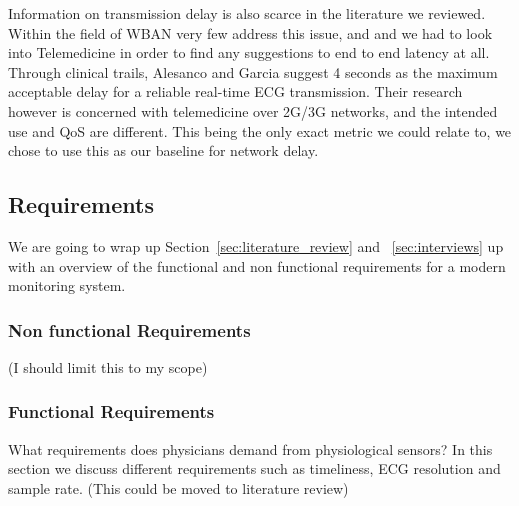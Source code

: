 Information on transmission delay is also scarce in the literature we reviewed. Within the field of WBAN very few address this issue, and and we had to look into Telemedicine in order to find any suggestions to end to end latency at all. Through clinical trails, Alesanco and Garcia suggest 4 seconds as the maximum acceptable delay for a reliable real-time ECG transmission. Their research however is concerned with telemedicine over 2G/3G networks, and the intended use and QoS are different. This being the only exact metric we could relate to, we chose to use this as our baseline for network delay.



\subsection{Requirements} %
\label{sub:requirements}

We are going to wrap up Section~\ref{sec:literature_review} and ~\ref{sec:interviews} up with an overview of the functional and non functional requirements for a modern monitoring system.

\subsubsection{Non functional Requirements} %
\label{ssub:non_functional_requirements}

(I should limit this to my scope)


\subsubsection{Functional Requirements} %
\label{ssub:functional_requirements}

What requirements does physicians demand from physiological sensors? In this section we discuss different requirements such as timeliness, ECG resolution and sample rate. (This could be moved to literature review)




